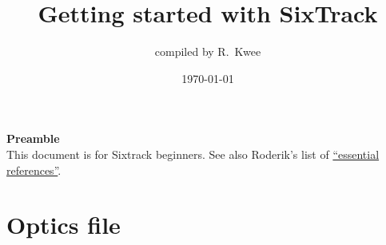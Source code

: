 \documentclass[a4paper, oneside, final]{scrartcl}
\begin{document}
\title{Getting started with SixTrack}
\author{\large{compiled by R.~Kwee}}

\date{\large{\today}}
        \maketitle


\setlength{\parindent}{0cm}
{\LARGE{\textbf{Preamble}}}\\

\noindent This document is for Sixtrack beginners. See also Roderik's list of {\href{http://rkwee.web.cern.ch/rkwee/HL-LHC/References-collimation.pdf}{``essential references''}}.
\section{Optics file}
\end{document}

